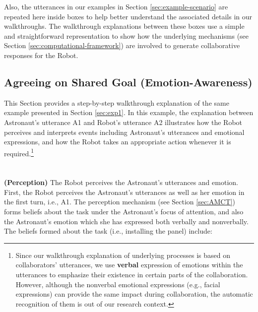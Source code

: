Also, the utterances in our examples in Section \ref{sec:example-scenario} are
repeated here inside boxes to help better understand the associated details in
our walkthroughs. The walkthrough explanations between these boxes use a simple
and straightforward representation to show how the underlying mechanisms (see
Section \ref{sec:computational-framework}) are involved to generate
collaborative responses for the Robot.

\subsection{Agreeing on Shared Goal (Emotion-Awareness)}
\label{sec:wt-exp1}

This Section provides a step-by-step walkthrough explanation of the same
example presented in Section \ref{sec:exp1}. In this example, the explanation
between Astronaut's utterance A1 and Robot's utterance A2 illustrates how the
Robot perceives and interprets events including Astronaut's utterances and
emotional expressions, and how the Robot takes an appropriate action whenever it
is required.\footnote{Since our walkthrough explanation of underlying processes
is based on collaborators' utterances, we use \textbf{verbal} expression of
emotions within the utterances to emphasize their existence in certain parts of
the collaboration. However, although the nonverbal emotional expressions (e.g.,
facial expressions) can provide the same impact during collaboration, the
automatic recognition of them is out of our research context.}\\

\noindent{}\\ \\

\noindent \textbf{(Perception)} The Robot perceives the Astronaut's utterances
and emotion.\\
  
First, the Robot perceives the Astronaut's utterances as well as her emotion in
the first turn, i.e., A1. The perception mechanism (see Section \ref{sec:AMCT})
forms beliefs about the task under the Astronaut's focus of attention, and also
the Astronaut's emotion which she has expressed both verbally and nonverbally.
The beliefs formed about the task (i.e., installing the panel) include:

